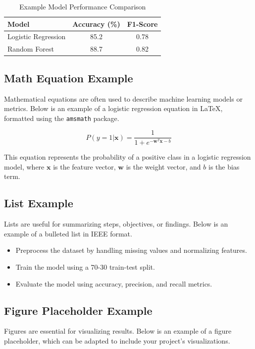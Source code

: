 \documentclass[conference]{IEEEtran}
\begin{document}
\begin{table}[ht]
    \centering
    \caption{Example Model Performance Comparison}
    \label{tab:example_table}
    \begin{tabular}{l c c}
        \toprule
        Model & Accuracy (\%) & F1-Score \\
        \midrule
        Logistic Regression & 85.2 & 0.78 \\
        Random Forest & 88.7 & 0.82 \\
        \bottomrule
    \end{tabular}
\end{table}

\subsection{Math Equation Example}
Mathematical equations are often used to describe machine learning models or metrics. Below is an example of a logistic regression equation in LaTeX, formatted using the \texttt{amsmath} package.

\begin{equation}
    P(y=1|\mathbf{x}) = \frac{1}{1 + e^{-\mathbf{w}^T \mathbf{x} - b}}
    \label{eq:logistic}
\end{equation}

This equation represents the probability of a positive class in a logistic regression model, where \(\mathbf{x}\) is the feature vector, \(\mathbf{w}\) is the weight vector, and \(b\) is the bias term.

\subsection{List Example}
Lists are useful for summarizing steps, objectives, or findings. Below is an example of a bulleted list in IEEE format.

\begin{itemize}
    \item Preprocess the dataset by handling missing values and normalizing features.
    \item Train the model using a 70-30 train-test split.
    \item Evaluate the model using accuracy, precision, and recall metrics.
\end{itemize}

\subsection{Figure Placeholder Example}
Figures are essential for visualizing results. Below is an example of a figure placeholder, which can be adapted to include your project’s visualizations.
\end{document}
